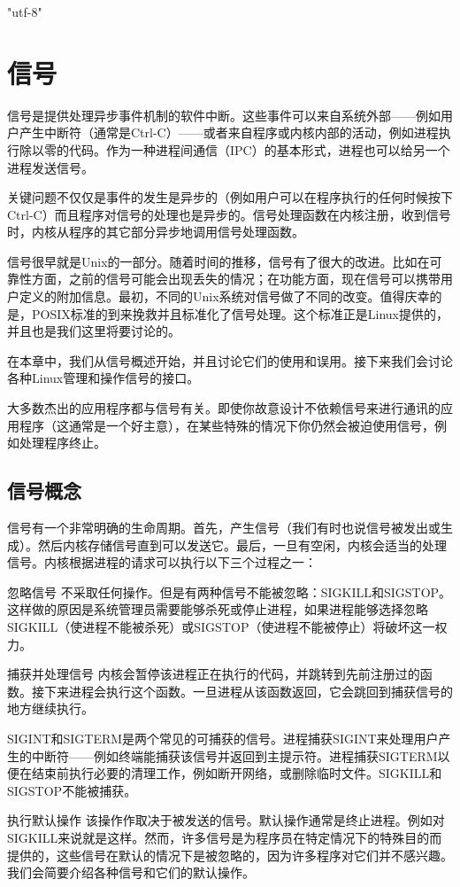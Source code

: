 \ifx\atempxetex\usewhat
\XeTeXinputencoding "utf-8"
\fi
{}

\chapter{信号}

信号是提供处理异步事件机制的软件中断。这些事件可以来自系统外部——例如用户产生中断符（通常是Ctrl-C）——或者来自程序或内核内部的活动，例如进程执行除以零的代码。作为一种进程间通信（IPC）的基本形式，进程也可以给另一个进程发送信号。

关键问题不仅仅是事件的发生是异步的（例如用户可以在程序执行的任何时候按下Ctrl-C）而且程序对信号的处理也是异步的。信号处理函数在内核注册，收到信号时，内核从程序的其它部分异步地调用信号处理函数。

信号很早就是Unix的一部分。随着时间的推移，信号有了很大的改进。比如在可靠性方面，之前的信号可能会出现丢失的情况；在功能方面，现在信号可以携带用户定义的附加信息。最初，不同的Unix系统对信号做了不同的改变。值得庆幸的是，POSIX标准的到来挽救并且标准化了信号处理。这个标准正是Linux提供的，并且也是我们这里将要讨论的。

在本章中，我们从信号概述开始，并且讨论它们的使用和误用。接下来我们会讨论各种Linux管理和操作信号的接口。

大多数杰出的应用程序都与信号有关。即使你故意设计不依赖信号来进行通讯的应用程序（这通常是一个好主意），在某些特殊的情况下你仍然会被迫使用信号，例如处理程序终止。

\section{信号概念}

信号有一个非常明确的生命周期。首先，产生信号（我们有时也说信号被发出或生成）。然后内核存储信号直到可以发送它。最后，一旦有空闲，内核会适当的处理信号。内核根据进程的请求可以执行以下三个过程之一： 

\begin{eqlist*}
\item[忽略信号] 不采取任何操作。但是有两种信号不能被忽略：SIGKILL和SIGSTOP。这样做的原因是系统管理员需要能够杀死或停止进程，如果进程能够选择忽略SIGKILL（使进程不能被杀死）或SIGSTOP（使进程不能被停止）将破坏这一权力。
\item[捕获并处理信号] 内核会暂停该进程正在执行的代码，并跳转到先前注册过的函数。接下来进程会执行这个函数。一旦进程从该函数返回，它会跳回到捕获信号的地方继续执行。

SIGINT和SIGTERM是两个常见的可捕获的信号。进程捕获SIGINT来处理用户产生的中断符——例如终端能捕获该信号并返回到主提示符。进程捕获SIGTERM以便在结束前执行必要的清理工作，例如断开网络，或删除临时文件。SIGKILL和SIGSTOP不能被捕获。
\item[执行默认操作] 该操作作取决于被发送的信号。默认操作通常是终止进程。例如对SIGKILL来说就是这样。然而，许多信号是为程序员在特定情况下的特殊目的而提供的，这些信号在默认的情况下是被忽略的，因为许多程序对它们并不感兴趣。我们会简要介绍各种信号和它们的默认操作。
\end{eqlist*}

